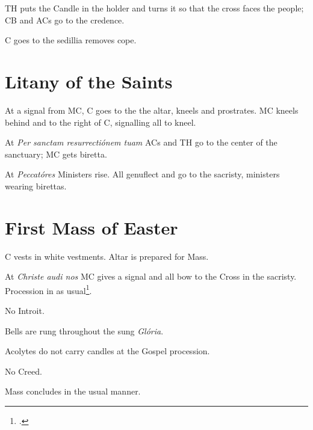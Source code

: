 {\rubric TH puts the Candle in the holder and turns it so that the cross faces
the people; CB and ACs go to the credence.

\rubric C goes to the sedillia removes cope.

\section{Litany of the Saints}

\rubric At a signal from MC, C goes to the the altar, kneels and prostrates. MC
kneels behind and to the right of C, signalling all to kneel.

\rubric At \textit{Per sanctam resurrectiónem tuam} ACs and TH go to the center
of the sanctuary; MC gets biretta.

\rubric At \textit{Peccatóres} Ministers rise. All genuflect and go to the
sacristy, ministers wearing birettas.

\section{First Mass of Easter}

\rubric C vests in white vestments. Altar is prepared for Mass.

\rubric At \textit{Christe audi nos} MC gives a signal and all bow to the Cross
in the sacristy. Procession in as usual\footcite[If the baptismal font was
blessed, the AC's candles are already on the credence table; if the font was
not blessed, the ACs carry them.][footnote, p. 233]{hweekls}.

\rubric No Introit.

\rubric Bells are rung throughout the sung \textit{Glória}.

\rubric Acolytes do not carry candles at the Gospel procession.

\rubric No Creed.

\rubric Mass concludes in the usual manner.

}

